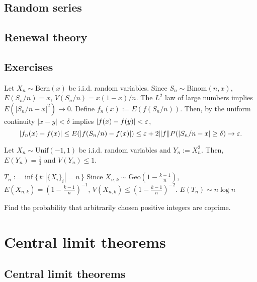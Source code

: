\documentclass{../note}
\def\Unif{\mathrm{Unif}}
\def\Bern{\mathrm{Bern}}
\def\Binom{\mathrm{Binom}}
\def\Geo{\mathrm{Geo}}
\begin{document}
\section{Random series}

\section{Renewal theory}

\section*{Exercises}
\begin{prb}
Let $X_n\sim\Bern(x)$ be i.i.d. random variables.
Since $S_n\sim\Binom(n,x)$, $E(S_n/n)=x$, $V(S_n/n)=x(1-x)/n$.
The $L^2$ law of large numbers implies $E(|S_n/n-x|^2)\to0$.
Define $f_n(x):=E(f(S_n/n))$.
Then, by the uniform continuity $|x-y|<\delta$ implies $|f(x)-f(y)|<\varepsilon$,
\[|f_n(x)-f(x)|\le E(|f(S_n/n)-f(x)|)\le\varepsilon+2\|f\|P(|S_n/n-x|\ge\delta)\to\varepsilon.\]
\end{prb}
\begin{prb}
Let $X_n\sim\Unif(-1,1)$ be i.i.d. random variables and $Y_n:=X_n^2$.
Then, $E(Y_n)=\frac13$ and $V(Y_n)\le1$.
\end{prb}
\begin{prb}
$T_n:=\inf\{\,t:|\{X_i\}_i|=n\,\}$
Since $X_{n,k}\sim\Geo(1-\frac{k-1}n)$, $E(X_{n,k})=(1-\frac{k-1}n)^{-1}$, $V(X_{n,k})\le(1-\frac{k-1}n)^{-2}$.
$E(T_n)\sim n\log n$
\end{prb}
\begin{prb}
\end{prb}
\begin{prb}
\end{prb}

\begin{prb}
Find the probability that arbitrarily chosen positive integers are coprime.
\end{prb}


\chapter{Central limit theorems}



\section{Central limit theorems}
\end{document}
